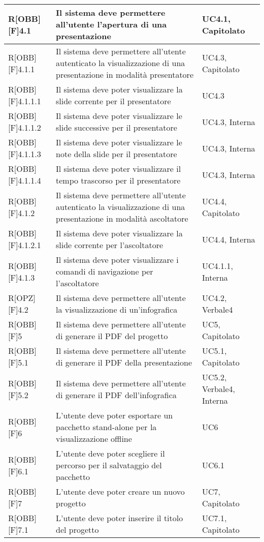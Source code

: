 	\begin{table}[h]
		\begin{tabular}{|p{}|p{}|p{}|}
			\midrule

			R[OBB][F]4.1 & Il sistema deve permettere all'utente l'apertura di una presentazione & UC4.1, Capitolato \\ \midrule
			R[OBB][F]4.1.1 & Il sistema deve permettere all'utente autenticato la visualizzazione di una presentazione in modalità presentatore & UC4.3, Capitolato \\ \midrule
			R[OBB][F]4.1.1.1 & Il sistema deve poter visualizzare la slide corrente per il presentatore & UC4.3 \\ \midrule
			R[OBB][F]4.1.1.2 & Il sistema deve poter visualizzare le slide successive per il presentatore & UC4.3, Interna \\ \midrule
			R[OBB][F]4.1.1.3 & Il sistema deve poter visualizzare le note della slide per il presentatore & UC4.3, Interna \\ \midrule
			R[OBB][F]4.1.1.4 & Il sistema deve poter visualizzare il tempo trascorso per il presentatore & UC4.3, Interna \\ \midrule
			R[OBB][F]4.1.2 & Il sistema deve permettere all'utente autenticato la visualizzazione di una presentazione in modalità ascoltatore & UC4.4, Capitolato \\ \midrule
			R[OBB][F]4.1.2.1 & Il sistema deve poter visualizzare la slide corrente per l'ascoltatore & UC4.4, Interna \\ \midrule
			R[OBB][F]4.1.3 & Il sistema deve poter visualizzare i comandi di navigazione per l'ascoltatore & UC4.1.1, Interna \\ \midrule
			R[OPZ][F]4.2 & Il sistema deve permettere all'utente la visualizzazione di un'\gls{infografica} & UC4.2, Verbale4 \\ \midrule
			R[OBB][F]5 & Il sistema deve permettere all'utente di generare il PDF del progetto & UC5, Capitolato \\ \midrule
			R[OBB][F]5.1 & Il sistema deve permettere all'utente di generare il PDF della presentazione & UC5.1, Capitolato \\ \midrule
			R[OBB][F]5.2 & Il sistema deve permettere all'utente di generare il PDF dell'\gls{infografica} & UC5.2, Verbale4, Interna \\ \midrule
			R[OBB][F]6 & L'utente deve poter esportare un pacchetto stand-alone per la visualizzazione offline & UC6 \\ \midrule
			R[OBB][F]6.1 & L'utente deve poter scegliere il percorso per il salvataggio del pacchetto & UC6.1 \\ \midrule
			R[OBB][F]7 & L'utente deve poter creare un nuovo progetto & UC7, Capitolato \\ \midrule
			R[OBB][F]7.1 & L'utente deve poter inserire il titolo del progetto & UC7.1, Capitolato \\ \midrule

		\end{tabular}
	\end{table}
	\newpage
	
